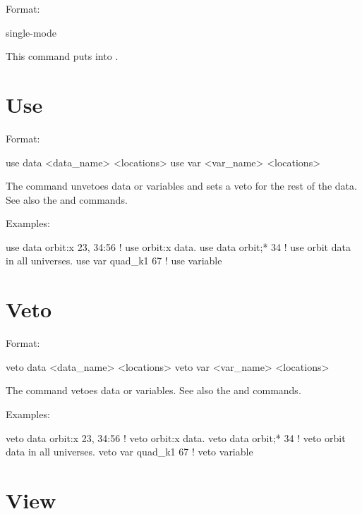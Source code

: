 Format:
\begin{example}
  single-mode
\end{example}

\vskip 0.2in 
This command puts \tao into . 

\section{Use}
\label{s:use}

Format:
\begin{example}
  use data  <data_name> <locations>
  use var <var_name> <locations>
\end{example}

\vskip 0.2in The  command unvetoes data or variables and sets
a veto for the rest of the data. See also the  and
 commands.

Examples:
\begin{example}
  use data orbit:x  23, 34:56 ! use orbit:x data.
  use data orbit;* 34         ! use orbit data in all universes.
  use var quad_k1 67          ! use variable
\end{example}


\section{Veto}
\label{s:veto}

Format:
\begin{example}
  veto data <data_name> <locations>
  veto var <var_name> <locations>
\end{example}

\vskip 0.2in The  command vetoes data or variables. See also
the  and  commands.

Examples:
\begin{example}
  veto data orbit:x  23, 34:56 ! veto orbit:x data.
  veto data orbit;* 34         ! veto orbit data in all universes.
  veto var quad_k1 67          ! veto variable
\end{example}

\section{View}
\label{s:view}

